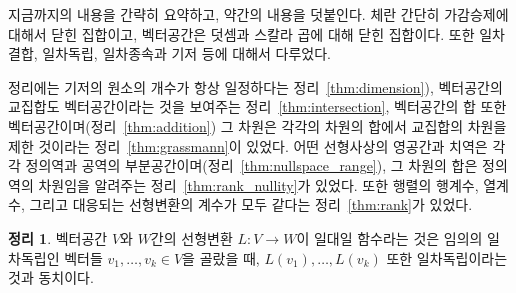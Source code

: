 \documentclass[unfonts,oneside,a4paper]{oblivoir}
\theoremstyle{definition}
\theoremstyle{theorem}
\newtheorem{theorem}[definition]{정리}
\theoremstyle{theorem}
\theoremstyle{remark}
\theoremstyle{remark}
\theoremstyle{remark}
\theoremstyle{remark}
\renewcommand{\vec}[1]{\bm{\mathit{#1}}}
\begin{document}
지금까지의 내용을 간략히 요약하고, 약간의 내용을 덧붙인다.
체란 간단히 가감승제에 대해서 닫힌 집합이고, 벡터공간은 덧셈과 스칼라 곱에 대해 닫힌 집합이다.
또한 일차결합, 일차독립, 일차종속과 기저 등에 대해서 다루었다.

정리에는 기저의 원소의 개수가 항상 일정하다는 정리~\ref{thm:dimension}), 벡터공간의 교집합도 벡터공간이라는 것을 보여주는 정리~\ref{thm:intersection}, 벡터공간의 합 또한 벡터공간이며(정리~\ref{thm:addition}) 그 차원은 각각의 차원의 합에서 교집합의 차원을 제한 것이라는 정리~\ref{thm:grassmann}이 있었다.
어떤 선형사상의 영공간과 치역은 각각 정의역과 공역의 부분공간이며(정리~\ref{thm:nullspace_range}), 그 차원의 합은 정의역의 차원임을 알려주는 정리~\ref{thm:rank_nullity}가 있었다.
또한 행렬의 행계수, 열계수, 그리고 대응되는 선형변환의 계수가 모두 같다는 정리~\ref{thm:rank}가 있었다.

\begin{theorem} \label{thm:image_independence}
    벡터공간 $V$와 $W$간의 선형변환 $L: V \rightarrow W$이 일대일 함수라는 것은 임의의 일차독립인 벡터들 $\vec v_1, \dots, \vec v_k \in V$을 골랐을 때, $L(\vec v_1), \dots, L(\vec v_k)$ 또한 일차독립이라는 것과 동치이다.
\end{theorem}
\end{document}
